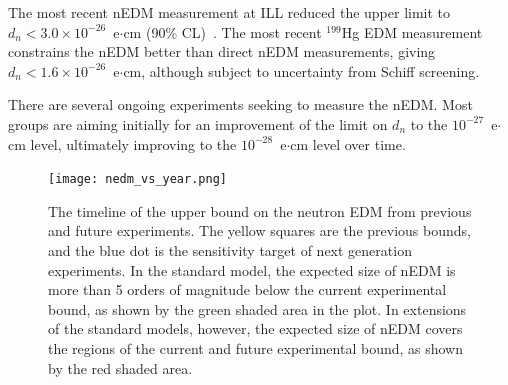 The most recent nEDM measurement at ILL reduced the upper limit to
$d_n< 3.0 \times 10^{-26}$~e$\cdot$cm (90\% CL)~\cite{Baker2006,
  Pendlebury2015}. The most recent $^{199}$Hg EDM
measurement~\cite{graner2016reduced} constrains the nEDM better than
direct nEDM measurements, giving
$d_n < 1.6 \times 10^{-26}$~e$\cdot$cm, although subject to
uncertainty from Schiff screening.

There are several ongoing experiments seeking to measure the
nEDM. Most groups are aiming initially for an improvement of the limit
on $d_n$ to the $10^{-27}$~e$\cdot$cm level, ultimately improving to
the $10^{-28}$~e$\cdot$cm level over time.


\begin{figure}[h!]
  \centering
  \texttt{[image: nedm\_vs\_year.png]}
  \caption[History of nEDM measurement]{The timeline of the upper
    bound on the neutron EDM from previous and future experiments. The
    yellow squares are the previous bounds, and the blue dot is the
    sensitivity target of next generation experiments.  In the
    standard model, the expected size of nEDM is more than 5 orders of
    magnitude below the current experimental bound, as shown by the
    green shaded area in the plot. In extensions of the standard
    models, however, the expected size of nEDM covers the regions of
    the current and future experimental bound, as shown by the red
    shaded area.~\cite{yoon2018neutron} }
  \label{fig:nEDMhistory}
\end{figure}

